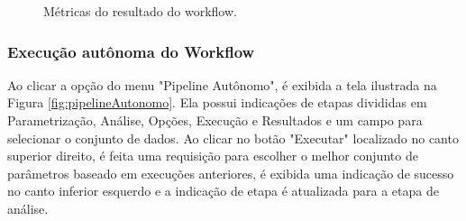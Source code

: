 \documentclass[portugues]{ic-tese}
\begin{document}
\begin{figure}[H]
    \centering
    \caption{Métricas do resultado do workflow.}
    \label{fig:pipelineManualMetricas}
\end{figure}

\subsubsection{Execução autônoma do Workflow}

Ao clicar a opção do menu "Pipeline Autônomo", é exibida a tela ilustrada na Figura \ref{fig:pipelineAutonomo}. Ela possui indicações de etapas divididas em Parametrização, Análise, Opções, Execução e Resultados e um campo para selecionar o conjunto de dados. Ao clicar no botão "Executar" localizado no canto superior direito, é feita uma requisição para escolher o melhor conjunto de parâmetros baseado em execuções anteriores, é exibida uma indicação de sucesso no canto inferior esquerdo e a indicação de etapa é atualizada para a etapa de análise.
\end{document}
